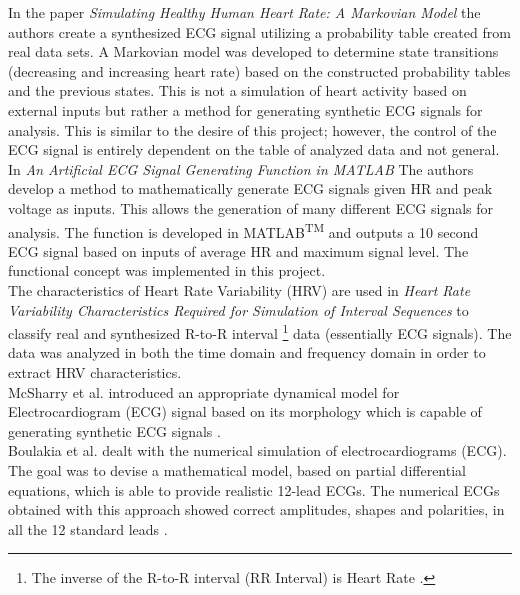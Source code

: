 \documentclass[paper=a4, fontsize=11pt]{scrartcl}
\numberwithin{equation}{section}		%
\numberwithin{figure}{section}			%
\numberwithin{table}{section}		    %
\begin{document}
In the paper \emph{Simulating Healthy Human Heart Rate: A Markovian Model} \cite{yang2002simulating}
the authors create a synthesized ECG signal utilizing a probability table created from real  data 
sets. A Markovian model was developed to determine state transitions (decreasing and increasing 
heart rate) based on the constructed probability tables and the previous states. This is not a 
simulation of heart activity based on external inputs but rather a method for generating synthetic 
ECG signals for analysis. This is similar to the desire of this project; however, the control of the
ECG signal is entirely dependent on the table of analyzed data and not general.\\

In \emph{An Artificial ECG Signal Generating Function in MATLAB} \cite{ackora2013artificial}
The authors develop a method to mathematically generate ECG signals given HR and peak voltage as 
inputs. This allows the generation of many different ECG signals for analysis. The function is 
developed in MATLAB\textsuperscript{TM} and outputs a 10 second ECG signal based on inputs of average 
HR and maximum signal level. The functional concept was implemented in this project. \\

The characteristics of Heart Rate Variability (HRV) are used in \emph{Heart Rate Variability 
	Characteristics Required for Simulation of Interval Sequences} \cite{smith2002heart} to classify
real and synthesized R-to-R interval
\footnote{The inverse of the R-to-R interval (RR Interval) is Heart Rate 
	\cite{mcsharry2003dynamical}.}
data (essentially ECG signals). The data was analyzed in both
the time domain and frequency domain in order to extract HRV characteristics.\\

McSharry et al. introduced an appropriate dynamical model for Electrocardiogram (ECG) signal 
based on its morphology which is capable of generating synthetic ECG signals
\cite{mcsharry2003dynamical}.\\

Boulakia  et al. dealt with the numerical simulation of electrocardiograms (ECG). The goal was to 
devise a mathematical model, based on partial differential equations, which is able to provide 
realistic 12-lead ECGs. The numerical ECGs obtained with this approach showed correct amplitudes, 
shapes and polarities, in all the 12 standard leads \cite{boulakia2010mathematical}.\\
\end{document}
